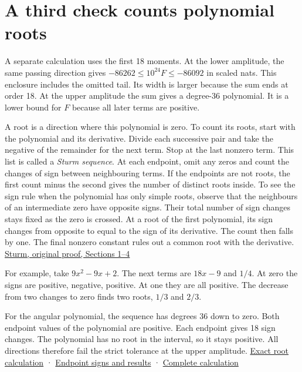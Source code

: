 \clearpage

\section{A third check counts polynomial roots}\label{a-third-check-counts-polynomial-roots}

A separate calculation uses the first 18 moments. At the lower amplitude, the same passing direction gives \(-86262 \le 10^{24}F \le -86092\) in scaled nats. This enclosure includes the omitted tail. Its width is larger because the sum ends at order 18. At the upper amplitude the sum gives a degree-36 polynomial. It is a lower bound for \(F\) because all later terms are positive.

A root is a direction where this polynomial is zero. To count its roots, start with the polynomial and its derivative. Divide each successive pair and take the negative of the remainder for the next term. Stop at the last nonzero term. This list is called a \emph{Sturm sequence}. At each endpoint, omit any zeros and count the changes of sign between neighbouring terms. If the endpoints are not roots, the first count minus the second gives the number of distinct roots inside. To see the sign rule when the polynomial has only simple roots, observe that the neighbours of an intermediate zero have opposite signs. Their total number of sign changes stays fixed as the zero is crossed. At a root of the first polynomial, its sign changes from opposite to equal to the sign of its derivative. The count then falls by one. The final nonzero constant rules out a common root with the derivative. \href{https://doi.org/10.1007/978-3-7643-7990-2_29}{Sturm, original proof, Sections 1--4}

For example, take \(9x^2-9x+2\). The next terms are \(18x-9\) and \(1/4\). At zero the signs are positive, negative, positive. At one they are all positive. The decrease from two changes to zero finds two roots, \(1/3\) and \(2/3\).

For the angular polynomial, the sequence has degrees 36 down to zero. Both endpoint values of the polynomial are positive. Each endpoint gives 18 sign changes. The polynomial has no root in the interval, so it stays positive. All directions therefore fail the strict tolerance at the upper amplitude. \href{https://github.com/sepahead/pid-rs/blob/main/audit/research/angular-ray-monotonicity/sturm_crossing.py}{Exact root calculation} · \href{https://github.com/sepahead/pid-rs/blob/main/audit/research/angular-ray-monotonicity/expected.json}{Endpoint signs and results} · \href{https://github.com/sepahead/pid-rs/blob/main/audit/research/angular-ray-monotonicity/STURM-SOURCE.md}{Complete calculation}

